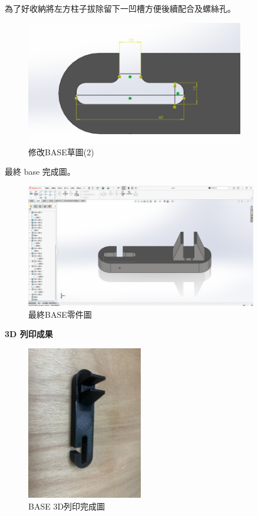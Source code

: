 為了好收納將左方柱子拔除留下一凹槽方便後續配合及螺絲孔。

\begin{figure}[htbp]
    \centering
    \includegraphics[width=0.85\textwidth]{./../images/6-1-38}
    \caption{修改BASE草圖(2)}
\end{figure}

\newpage

最終 base 完成圖。

\begin{figure}[htbp]
    \centering
    \includegraphics[width=0.9\textwidth]{./../images/6-1-39}
    \caption{最終BASE零件圖}
\end{figure}

\textbf{3D 列印成果}

\begin{figure}[htbp]
    \centering
    \includegraphics[width=0.45\textwidth]{./../images/6-1-25}
    \caption{BASE 3D列印完成圖}
\end{figure}

